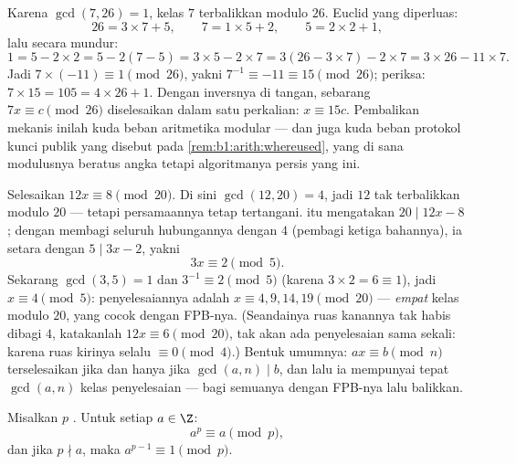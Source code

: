 \begin{example}\label{ex:b1:arith:inv7mod26}
Karena $\gcd(7, 26) = 1$, kelas $7$ terbalikkan modulo $26$.
Euclid yang diperluas:
\[
26 = 3 \times 7 + 5, \qquad
7 = 1 \times 5 + 2, \qquad
5 = 2 \times 2 + 1 ,
\]
lalu secara mundur:
\[
1 = 5 - 2 \times 2 = 5 - 2(7 - 5) = 3 \times 5 - 2 \times 7
= 3(26 - 3 \times 7) - 2 \times 7 = 3 \times 26 - 11 \times 7 .
\]
Jadi $7 \times (-11) \equiv 1 \pmod{26}$, yakni $7^{-1} \equiv
-11 \equiv 15 \pmod{26}$; periksa: $7 \times 15 = 105 = 4 \times 26
+ 1$. Dengan inversnya di tangan, sebarang  $7x \equiv c
\pmod{26}$ diselesaikan dalam satu perkalian: $x \equiv 15c$. Pembalikan
mekanis inilah kuda beban aritmetika modular ---
dan juga kuda beban protokol kunci publik yang disebut pada
\cref{rem:b1:arith:whereused}, yang di sana modulusnya beratus
angka tetapi algoritmanya persis yang ini.
\end{example}

\begin{example}\label{ex:b1:arith:noninvertible}
Selesaikan $12x \equiv 8 \pmod{20}$. Di sini $\gcd(12, 20) = 4$, jadi $12$
tak terbalikkan modulo $20$ --- tetapi persamaannya tetap
tertangani.  itu mengatakan $20 \mid 12x - 8$; dengan membagi
seluruh hubungannya dengan $4$ (pembagi ketiga bahannya), ia
setara dengan $5 \mid 3x - 2$, yakni
\[
3x \equiv 2 \pmod 5 .
\]
Sekarang $\gcd(3, 5) = 1$ dan $3^{-1} \equiv 2 \pmod 5$ (karena $3 \times 2 =
6 \equiv 1$), jadi $x \equiv 4 \pmod 5$: penyelesaiannya adalah $x
\equiv 4, 9, 14, 19 \pmod{20}$ --- \emph{empat} kelas modulo $20$,
yang cocok dengan FPB-nya. (Seandainya ruas kanannya tak habis dibagi $4$,
katakanlah $12x \equiv 6 \pmod{20}$, tak akan ada penyelesaian sama sekali:
karena ruas kirinya selalu $\equiv 0 \pmod 4$.) Bentuk umumnya: $ax
\equiv b \pmod n$ terselesaikan jika dan hanya jika $\gcd(a, n) \mid b$, dan lalu ia
mempunyai tepat $\gcd(a, n)$ kelas penyelesaian --- bagi semuanya
dengan FPB-nya lalu balikkan.
\end{example}

\begin{theorem}\label{thm:b1:arith:fermat}
Misalkan $p$ . Untuk setiap $a \in \Z$:
\[
a^p \equiv a \pmod p,
\]
dan jika $p \nmid a$, maka $a^{p-1} \equiv 1 \pmod
p$.
\end{theorem}

